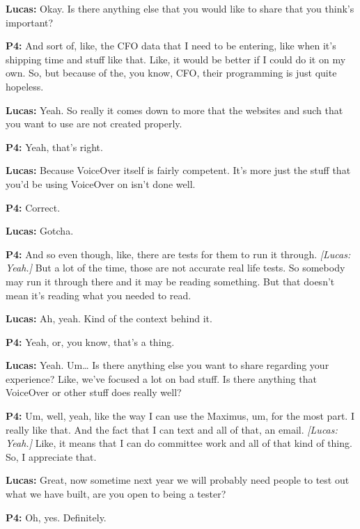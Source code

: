 \textbf{Lucas:} Okay. Is there anything else that you would like to share that you think's important?

\textbf{P4:} And sort of, like, the CFO data that I need to be entering, like when it's shipping time and stuff like that. Like, it would be better if I could do it on my own. So, but because of the, you know, CFO, their programming is just quite hopeless.

\textbf{Lucas:} Yeah. So really it comes down to more that the websites and such that you want to use are not created properly.

\textbf{P4:} Yeah, that's right.

\textbf{Lucas:} Because VoiceOver itself is fairly competent. It's more just the stuff that you'd be using VoiceOver on isn't done well.

\textbf{P4:} Correct.

\textbf{Lucas:} Gotcha.

\textbf{P4:} And so even though, like, there are tests for them to run it through. \textit{[Lucas: Yeah.]} But a lot of the time, those are not accurate real life tests. So somebody may run it through there and it may be reading something. But that doesn't mean it's reading what you needed to read.

\textbf{Lucas:} Ah, yeah. Kind of the context behind it.

\textbf{P4:} Yeah, or, you know, that's a thing.

\textbf{Lucas:} Yeah. Um\ldots{} Is there anything else you want to share regarding your experience? Like, we've focused a lot on bad stuff. Is there anything that VoiceOver or other stuff does really well?

\textbf{P4:} Um, well, yeah, like the way I can use the Maximus, um, for the most part. I really like that. And the fact that I can text and all of that, an email. \textit{[Lucas: Yeah.]} Like, it means that I can do committee work and all of that kind of thing. So, I appreciate that.

\textbf{Lucas:} Great, now sometime next year we will probably need people to test out what we have built, are you open to being a tester?

\textbf{P4:} Oh, yes. Definitely.
